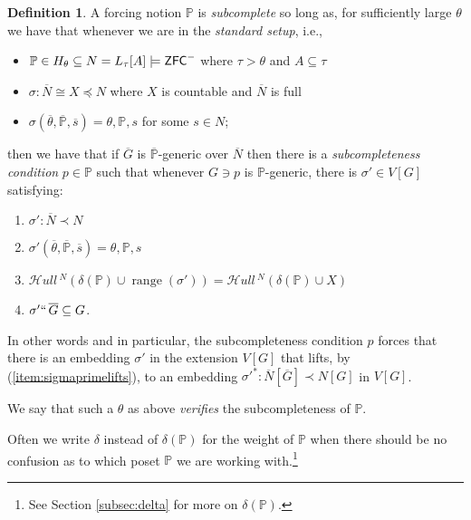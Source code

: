 \documentclass{amsart}
\newtheorem{proposition}[theorem]{Proposition}
\theoremstyle{definition}
\newtheorem{definition}[theorem]{Definition}
\theoremstyle{remark}
\renewcommand{\P}{\mathbb{P}}
\newcommand{\N}{{\overline{N}}}
\newcommand{\G}{\overline{G}}
\newcommand{\ZFC}{\textup{\ensuremath{\textsf{ZFC}}}}
\DeclareMathOperator{\ran}{range}
\newcommand{\SH}{\mathcal{H}\textit{ull} \,}
\newcommand{\sk}[3]{\SH^{#1}( {#2} \cup {\ran(#3)} ) }
\newcommand{\Sk}[3]{\SH^{#1}( {#2} \cup {#3} ) }
\begin{document}
\begin{definition} \label{definition:SC}
A forcing notion $\P$ is \emph{subcomplete} so long as,
for sufficiently large $\theta$ we have that whenever we are in the \emph{standard setup}, i.e., \begin{itemize}
	\item $\P \in H_\theta \subseteq N = L_\tau[A] \models \ZFC^-$ where $\tau>\theta$ and $A \subseteq \tau$
	\item $\sigma: \N \cong X \preccurlyeq N$ where $X$ is countable and $\N$ is full
	\item $\sigma(\overline \theta, \overline{\P}, \overline s)=\theta, \P, s$ for some $s \in N$;
\end{itemize}
then we have that if $\G$ is  $\overline{\P}$-generic over $\N$ then there is a \emph{subcompleteness condition} $p \in \P$ such that whenever $G \ni p$ is $\P$-generic, there is $\sigma' \in V[G]$ satisfying: \begin{enumerate}
	\item $\sigma': \N \prec N$
	\item $\sigma'(\overline \theta, \overline{\P}, \overline s)=\theta, \P, s$
	\item \label{item:skolemcompatibility} $\sk{N}{\delta(\P)}{\sigma'} = \Sk{N}{\delta(\P)}{X}$
	\item \label{item:sigmaprimelifts} $\sigma'``\, \G \subseteq G$.
\end{enumerate}
In other words and in particular, the subcompleteness condition $p$ forces that there is an embedding $\sigma'$ in the extension $V[G]$ that lifts, by (\ref{item:sigmaprimelifts}), to an embedding $\sigma'^*:\N[\G] \prec N[G]$ in $V[G]$.

We say that such a $\theta$ as above \emph{verifies} the subcompleteness of $\P$.

Often we write $\delta$ instead of $\delta(\P)$ for the weight of $\P$ when there should be no confusion as to which poset $\P$ we are working with.\footnote{See Section \ref{subsec:delta} for more on $\delta(\P)$.}
\end{definition}
%
\end{document}
